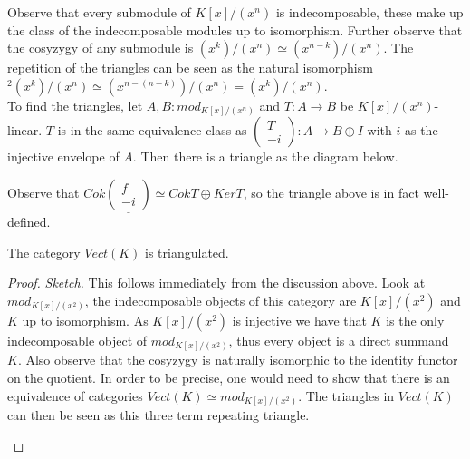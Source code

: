     Observe that every submodule of $K[x]/(x^n)$ is indecomposable, these make up the class of the indecomposable modules up to isomorphism. Further observe that the cosyzygy of any submodule is \upside{$\Omega$}$(x^k)/(x^n)\simeq (x^{n-k})/(x^n)$. The repetition of the triangles can be seen as the natural isomorphism \upside{$\Omega$}$^2(x^k)/(x^n)\simeq (x^{n-(n-k)})/(x^n) = (x^k)/(x^n)$. \\

    To find the triangles, let $A,B:mod_{K[x]/(x^n)}$ and $T:A\rightarrow B$ be $K[x]/(x^n)$-linear. $T$ is in the same equivalence class as $\begin{pmatrix} T \\ -i \end{pmatrix}:A\rightarrow B\oplus I$ with $i$ as the injective envelope of $A$. Then there is a triangle as the diagram below.

    \begin{center}
    \end{center}

    Observe that $Cok\underline{\begin{pmatrix} f \\ -i \end{pmatrix}} \simeq Cok\underline{T}\oplus Ker$\underline{\upside{$\Omega$}$T$}, so the triangle above is in fact well-defined.

    \begin{lemma}
        The category $Vect(K)$ is triangulated.
    \end{lemma}

    \begin{proof}\emph{Sketch.} This follows immediately from the discussion above. Look at $mod_{K[x]/(x^2)}$, the indecomposable objects of this category are $K[x]/(x^2)$ and $K$ up to isomorphism. As $K[x]/(x^2)$ is injective we have that $K$ is the only indecomposable object of \underline{$mod_{K[x]/(x^2)}$}, thus every object is a direct summand $K$. Also observe that the cosyzygy is naturally isomorphic to the identity functor on the quotient. In order to be precise, one would need to show that there is an equivalence of categories $Vect(K)\simeq mod_{K[x]/(x^2)}$. The triangles in $Vect(K)$ can then be seen as this three term repeating triangle.
        \begin{center}
        \end{center}
    \end{proof}

